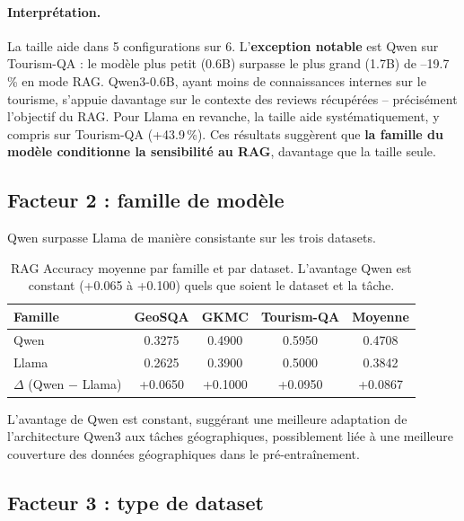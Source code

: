 \documentclass[12pt,a4paper]{article}
\begin{document}
\paragraph{Interpr\'etation.}
La taille aide dans 5 configurations sur 6. L'\textbf{exception notable} est Qwen sur
Tourism-QA : le mod\`ele plus petit (0.6B) surpasse le plus grand (1.7B) de --19.7\,\%
en mode RAG. Qwen3-0.6B, ayant moins de connaissances internes sur le tourisme, s'appuie
davantage sur le contexte des reviews r\'ecup\'er\'ees -- pr\'ecis\'ement l'objectif du RAG.
Pour Llama en revanche, la taille aide syst\'ematiquement, y compris sur Tourism-QA
(+43.9\,\%). Ces r\'esultats sugg\`erent que \textbf{la famille du mod\`ele conditionne
la sensibilit\'e au RAG}, davantage que la taille seule.

\subsection{Facteur 2 : famille de mod\`ele}

Qwen surpasse Llama de mani\`ere consistante sur les trois datasets.

\begin{table}[H]
\centering
\caption{RAG Accuracy moyenne par famille et par dataset.
  L'avantage Qwen est constant (+0.065 \`a +0.100) quels que soient le dataset et la t\^ache.}
\label{tab:famille}
\begin{tabular}{@{} l c c c c @{}}
\toprule
\textbf{Famille} & \textbf{GeoSQA} & \textbf{GKMC} & \textbf{Tourism-QA} & \textbf{Moyenne} \\
\midrule
Qwen  & 0.3275 & 0.4900 & 0.5950 & 0.4708 \\
\rowcolor{lightgray}
Llama & 0.2625 & 0.3900 & 0.5000 & 0.3842 \\
\midrule
$\Delta$ (Qwen $-$ Llama)
  & \textcolor{green!60!black}{+0.0650}
  & \textcolor{green!60!black}{+0.1000}
  & \textcolor{green!60!black}{+0.0950}
  & \textcolor{green!60!black}{+0.0867} \\
\bottomrule
\end{tabular}
\end{table}

L'avantage de Qwen est constant, sugg\'erant une meilleure adaptation de l'architecture
Qwen3 aux t\^aches g\'eographiques, possiblement li\'ee \`a une meilleure couverture des
donn\'ees g\'eographiques dans le pr\'e-entra\^inement.

\subsection{Facteur 3 : type de dataset}
\end{document}
